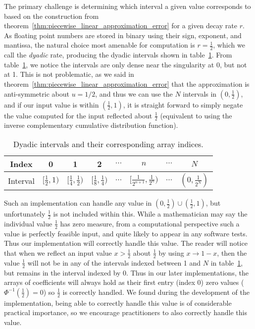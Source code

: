 \documentclass[9pt,a4paper,english]{extarticle}
\begin{document}
The primary challenge is determining which interval a given value corresponds to based on the construction from theorem~\ref{thm:piecewise_linear_approximation_error} for a given decay rate $ r $. As floating point numbers are stored in binary using their sign, exponent, and mantissa, the natural choice most amenable for computation is $ r = \tfrac{1}{2} $, which we call the \emph{dyadic} rate, producing the dyadic intervals shown in table~\ref{tab:dyadic_intervals}. From table~\ref{tab:dyadic_intervals}, we notice the intervals are only dense near the singularity at 0, but not at 1. This is not problematic, as we said in theorem~\ref{thm:piecewise_linear_approximation_error} that the approximation is anti-symmetric about $ u=1/2 $, and thus we can use the $ N $ intervals in $ (0, \tfrac{1}{2}) $, and if our input value is within $ (\tfrac{1}{2}, 1) $, it is straight forward to simply negate the value computed for the input reflected about $ \tfrac{1}{2} $ (equivalent to using the inverse complementary cumulative distribution function). 

\begin{table}[htb]
\centering
\caption{Dyadic intervals and their corresponding array indices.}
\label{tab:dyadic_intervals}
\renewcommand{\arraystretch}{1.4}  %
\begin{tabular}{c|ccccccc}
Index & 0 & 1 & 2 & $ \cdots $ & $ n $ & $ \cdots $ & $ N $ \\ \hline
Interval & $ [\tfrac{1}{2}, 1) $ & $ [\tfrac{1}{4}, \tfrac{1}{2}) $ & $ [\tfrac{1}{8}, \tfrac{1}{4}) $ & $ \cdots $ & $ [\tfrac{1}{2^{n+1}}, \tfrac{1}{2^n}) $ & $ \cdots $ & $ (0, \tfrac{1}{2^N}) $
\end{tabular}
\end{table}

Such an implementation can handle any value in $ (0, \tfrac{1}{2}) \cup (\tfrac{1}{2}, 1) $, but unfortunately $ \tfrac{1}{2} $ is not included within this. While a mathematician may say the individual value $ \tfrac{1}{2} $ has zero measure, from a computational perspective such a value is perfectly feasible input, and quite likely to appear in any software tests. Thus our implementation will correctly handle this value. The reader will notice that when we reflect an input value $ x > \tfrac{1}{2} $ about $ \tfrac{1}{2} $ by using $ x \to 1 - x $, then the value $ \tfrac{1}{2} $ will not be in any of the intervals indexed between 1 and $ N $ in table~\ref{tab:dyadic_intervals}, but remains in the interval indexed by 0. Thus in our later implementations, the arrays of coefficients will always hold as their first entry (index 0) zero values ($ \Phi^{-1}(\tfrac{1}{2}) = 0 $) so $ \tfrac{1}{2} $ is correctly handled. We found during the development of the implementation, being able to correctly handle this value is of considerable practical importance, so we encourage practitioners to also correctly handle this value. 
\end{document}
